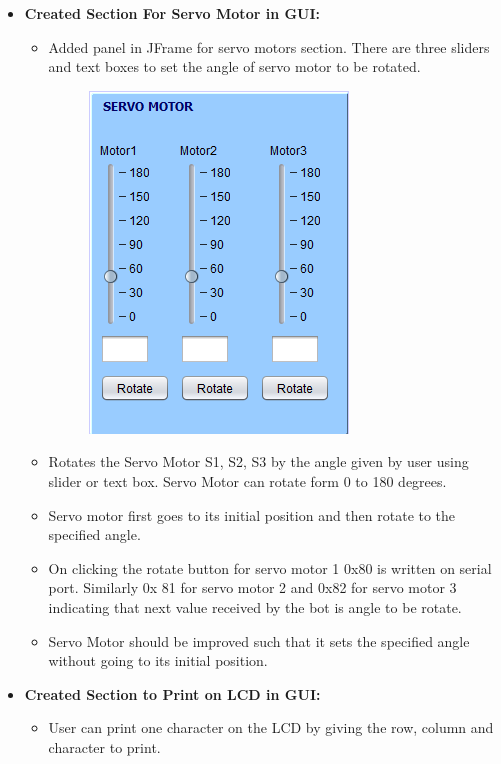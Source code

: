 \documentclass{article}
\begin{document}
\begin{enumerate}
\begin{itemize}
\begin{figure}[h]
\begin{center}
			 	\end{center}
			 \end{figure}
			 \item \textbf{Created Section For Servo Motor in GUI:} 
			 \begin{itemize}
			 	\item Added panel in JFrame for servo motors section. There are three sliders and text boxes to set the angle of servo motor to be rotated.
			 	\newpage
			 	\begin{figure}[h]
			 		\begin{center}
			 			\includegraphics[scale=0.75]{servomotor.png}
			 		\end{center}
			 	\end{figure} 
			 	\item Rotates the Servo Motor S1, S2, S3 by the angle given by user using slider or text box. Servo Motor can rotate form 0 to 180 degrees.
			 	\item Servo motor first goes to its initial position and then rotate to the specified angle.
			 	\item On clicking the rotate button for servo motor 1 0x80 is written on serial port. Similarly 0x 81 for servo motor 2 and 0x82 for servo motor 3 indicating that next value received by the bot is angle to be rotate.
			 	\item Servo Motor should be improved such that it sets the specified angle without going to its initial position. 
			 \end{itemize}
			 \item \textbf{Created Section to Print on LCD in GUI:}
			 \begin{itemize}
			 	\item User can print one character on the LCD by giving the row, column and character to print. \\

\end{itemize}
\end{itemize}
\end{enumerate}
\end{document}
